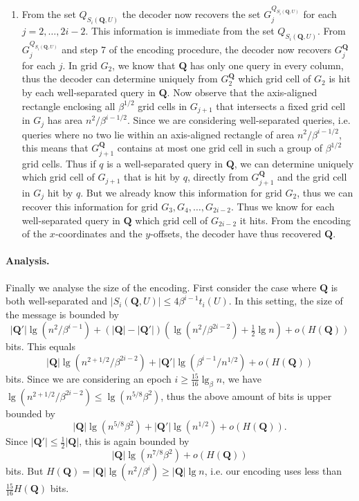 \documentclass[letterpaper]{article}
\newcommand{\Q}{\textbf{Q}}
\begin{document}
\begin{enumerate}
\item From the set $Q_{S_i(\Q,U)}$ the decoder now recovers the set
  $G_j^{Q_{S_i(\Q,U)}}$ for each $j=2,\dots,2i-2$. This information is
  immediate from the set $Q_{S_i(\Q,U)}$. From $G_j^{Q_{S_i(\Q,U)}}$ and
  step 7 of the encoding procedure, the decoder now recovers $G_j^{\Q}$
  for each $j$. In grid $G_2$, we know that $\Q$ has only one query in
  every column, thus the decoder can determine uniquely from $G_2^{\Q}$
  which grid cell of $G_2$ is hit by each well-separated query in
  $\Q$. Now observe that the axis-aligned rectangle enclosing all
  $\beta^{1/2}$ grid cells in $G_{j+1}$ that intersects a fixed
  grid cell in $G_j$ has area $n^2/\beta^{i-1/2}$. Since we are
  considering well-separated queries, i.e. queries where no two lie
  within an axis-aligned rectangle of area $n^2/\beta^{i-1/2}$, this
  means that $G_{j+1}^{\Q}$ contains at most one grid cell in such a
  group of $\beta^{1/2}$ grid cells. Thus if $q$ is a well-separated
  query in $\Q$, we can determine uniquely which grid cell of $G_{j+1}$
  that is hit by $q$, directly from $G_{j+1}^{\Q}$ and the grid cell in
  $G_j$ hit by $q$. But we already know this information for grid
  $G_2$, thus we can recover this information for grid
  $G_3,G_4,\dots,G_{2i-2}$. Thus we know for each well-separated query
  in $\Q$ which grid cell of $G_{2i-2}$ it hits. From the encoding of
  the $x$-coordinates and the $y$-offsets, the decoder have thus
  recovered $\Q$.
\end{enumerate}

\paragraph{Analysis.}
Finally we analyse the size of the encoding. First consider the case
where $\Q$ is both well-separated and $|S_i(\Q,U)|\leq 4
\beta^{i-1}t_i(U)$. In this setting, the size of the message is
bounded by
\[
|\Q'|\lg(n^2/\beta^{i-1})+(|\Q|-|\Q'|)(\lg(n^2/\beta^{2i-2})+\tfrac{1}{2}\lg
n)+o(H(\Q))
\]
bits. This equals
\[
|\Q|\lg(n^{2+1/2}/\beta^{2i-2})+|\Q'|\lg(\beta^{i-1}/n^{1/2})+o(H(\Q))
\]
bits. Since we are considering an epoch $i \geq
\tfrac{15}{16}\lg_\beta n$, we have $\lg(n^{2+1/2}/\beta^{2i-2}) \leq
\lg(n^{5/8}\beta^2)$, thus the above amount of bits is upper bounded
by
\[
|\Q|\lg(n^{5/8}\beta^2)+|\Q'|\lg(n^{1/2})+o(H(\Q)).
\]
Since $|\Q'| \leq \tfrac{1}{2}|\Q|$, this is
again bounded by
\[
|\Q|\lg(n^{7/8}\beta^2)+o(H(\Q))
\]
bits. But $H(\Q) = |\Q|\lg(n^2/\beta^i) \geq |\Q|\lg n$, i.e. our
encoding uses less than $\tfrac{15}{16}H(\Q)$ bits.
\end{document}
